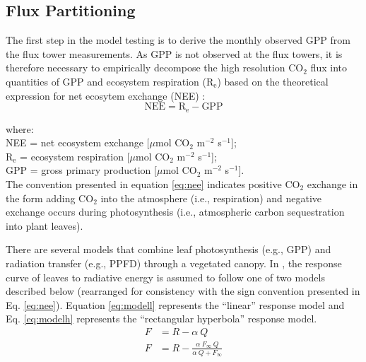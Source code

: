 \subsection{Flux Partitioning}
\label{sec:fluxparti}
The first step in the model testing is to derive the monthly observed GPP from the flux tower measurements.
As GPP is not observed at the flux towers, it is therefore necessary to empirically decompose the high resolution CO$_{2}$ flux into quantities of GPP and ecosystem respiration (R$_{\mathrm{e}}$) based on the theoretical expression for net ecosytem exchange (NEE) \parencite{lovett06}:
%
\begin{equation}
\label{eq:nee}
    \text{NEE} = \text{R}_{\text{e}} - \text{GPP}
\end{equation}

\noindent where:\\
\indent NEE = net ecosystem exchange [$\mu$mol CO$_2$ m$^{-2}$ s$^{-1}$];\\
\indent R$_\text{e}$ = ecosystem respiration [$\mu$mol CO$_2$ m$^{-2}$ s$^{-1}$];\\
\indent GPP = gross primary production [$\mu$mol CO$_2$ m$^{-2}$ s$^{-1}$].\\

\noindent The convention presented in equation \ref{eq:nee} indicates positive CO$_{2}$ exchange in the form adding CO$_{2}$ into the atmosphere (i.e., respiration) and negative exchange occurs during photosynthesis (i.e., atmospheric carbon sequestration into plant leaves). 

There are several models that combine leaf photosynthesis (e.g., GPP) and radiation transfer (e.g., PPFD) through a vegetated canopy.  
In \parencite{ruimy95}, the response curve of leaves to radiative energy is assumed to follow one of two models described below (rearranged for consistency with the sign convention presented in Eq. \ref{eq:nee}).  
Equation \ref{eq:modell} represents the ``linear'' response model and Eq. \ref{eq:modelh} represents the ``rectangular hyperbola'' response model.
\begin{subequations}
\label{eq:fmodels}
\begin{align}
    F &= R - \alpha\: Q \label{eq:modell} \\
    F &= R - \frac{\alpha\: F_\infty\: Q}
                  {\alpha\: Q + F_\infty}\label{eq:modelh}
\end{align}
\end{subequations}

